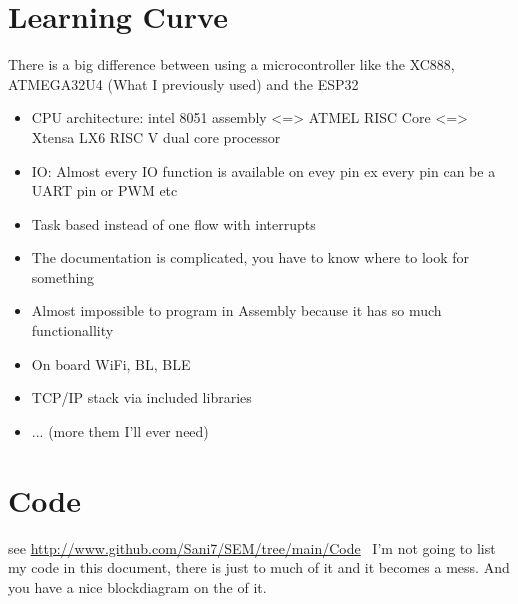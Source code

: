 \documentclass[a4paper,twoside, 12pt]{report}
\theoremstyle{break}
\begin{document}
\section{Learning Curve}
There is a big difference between using a microcontroller like the XC888, ATMEGA32U4 (What I previously used) and the ESP32
\begin{itemize}
\item CPU architecture: intel 8051 assembly <=> ATMEL RISC Core <=>  Xtensa LX6 RISC V dual core processor
\item IO: Almost every IO function is available on evey pin ex every pin can be a UART pin or PWM etc
\item Task based instead of one flow with interrupts
\item The documentation is complicated, you have to know where to look for something
\item Almost impossible to program in Assembly because it has so much functionallity
\item On board WiFi, BL, BLE
\item TCP/IP stack via included libraries
\item ... (more them I'll ever need)
\end{itemize}
\section{Code}
see \url{http://www.github.com/Sani7/SEM/tree/main/Code} \ I'm not going to list my code in this document, there is just to much of it and it becomes a mess. And you have a nice blockdiagram on the of it.
\end{document}
